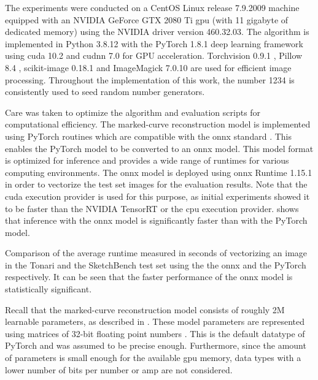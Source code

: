 The experiments were conducted on a CentOS Linux release 7.9.2009 machine equipped with an NVIDIA GeForce GTX 2080 Ti \gls{gpu} (with 11 gigabyte of dedicated memory) using the NVIDIA driver version 460.32.03. The algorithm is implemented in Python 3.8.12 \citep{python} with the PyTorch 1.8.1 \citep{Paszke_PyTorch_An_Imperative_2019} deep learning framework using \gls{cuda} 10.2 \citep{cuda} and \gls{cudnn} 7.0 \citep{DBLP:journals/corr/ChetlurWVCTCS14} for GPU acceleration. Torchvision 0.9.1 \citep{TorchVision_maintainers_and_contributors_TorchVision_PyTorch_s_Computer_2016}, Pillow 8.4 \citep{clark2015pillow}, scikit-image 0.18.1 \citep{10.7717/peerj.453} and ImageMagick 7.0.10 \citep{imagemagick} are used for efficient image processing. Throughout the implementation of this work, the number 1234 is consistently used to seed random number generators.

Care was taken to optimize the algorithm and evaluation scripts for computational efficiency. The marked-curve reconstruction model is implemented using PyTorch routines which are compatible with the \gls{onnx} standard \citep{bai2019}. This enables the PyTorch model to be converted to an \gls{onnx} model. This model format is optimized for inference and provides a wide range of runtimes for various computing environments. The \gls{onnx} model is deployed using \gls{onnx} Runtime 1.15.1 \citep{onnxruntime} in order to vectorize the test set images for the evaluation results. Note that the \gls{cuda} execution provider is used for this purpose, as initial experiments showed it to be faster than the NVIDIA TensorRT or the \gls{cpu} execution provider.  shows that inference with the \gls{onnx} model is significantly faster than with the PyTorch model.

\begin{table}[]
    \centering
    
    \caption{Comparison of the average runtime measured in seconds of vectorizing an image in the Tonari and the SketchBench test set using the  the \gls{onnx} and the PyTorch \citep{Paszke_PyTorch_An_Imperative_2019} respectively. It can be seen that the faster performance of the \gls{onnx} model is statistically significant.}
    \label{tab:runtime-comp}
\end{table}

Recall that the marked-curve reconstruction model consists of roughly 2M learnable parameters, as described in . These model parameters are represented using matrices of 32-bit floating point numbers \citep{8766229}. This is the default datatype of PyTorch and was assumed to be precise enough. Furthermore, since the amount of parameters is small enough for the available \gls{gpu} memory, data types with a lower number of bits per number or \gls{amp} \citep{DBLP:conf/iclr/MicikeviciusNAD18} are not considered.

